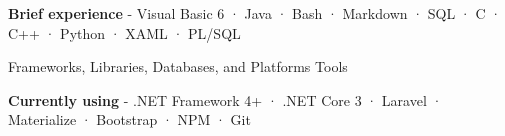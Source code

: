 \begin{cventries}
{\begin{cvitems}
        \item {\textbf{Brief experience} \hspace{0.03cm} - \hspace{0.03cm} Visual Basic 6 \hspace{0.03cm} · \hspace{0.03cm} Java \hspace{0.03cm} · \hspace{0.03cm} Bash \hspace{0.03cm} · \hspace{0.03cm} Markdown \hspace{0.03cm} · \hspace{0.03cm} SQL \hspace{0.03cm} · \hspace{0.03cm} C \hspace{0.03cm} · \hspace{0.03cm} C++ \hspace{0.03cm} · \hspace{0.03cm} Python \hspace{0.03cm} · \hspace{0.03cm} XAML \hspace{0.03cm} · \hspace{0.03cm} PL/SQL \\} %
      \end{cvitems}
    }
  \cventry
    {Frameworks, Libraries, Databases, and Platforms} %
    {Tools} %
    {} %
    {} %
    {
      \begin{cvitems} %
        \item {\textbf{Currently using} \hspace{0.03cm} - \hspace{0.03cm}  .NET Framework 4+ \hspace{0.03cm} · \hspace{0.03cm} .NET Core 3 \hspace{0.03cm} · \hspace{0.03cm} Laravel \hspace{0.03cm} · \hspace{0.03cm} Materialize \hspace{0.03cm} · \hspace{0.03cm} Bootstrap \hspace{0.03cm} · \hspace{0.03cm} NPM \hspace{0.03cm} · \hspace{0.03cm} Git} %

\end{cvitems}}
\end{cventries}
